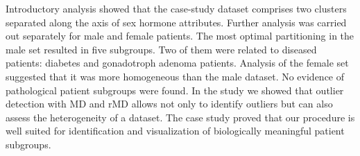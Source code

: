 \documentclass[\main/boa.tex]{subfiles}
\begin{document}
Introductory analysis showed that the case-study dataset comprises two
clusters separated along the axis of sex hormone attributes. Further
analysis was carried out separately for male and female patients. The
most optimal partitioning in the male set resulted in five subgroups.
Two of them were related to diseased patients: diabetes and gonadotroph
adenoma patients. Analysis of the female set suggested that it was more
homogeneous than the male dataset. No evidence of pathological patient
subgroups were found. In the study we showed that outlier detection with
MD and rMD allows not only to identify outliers but can also assess the
heterogeneity of a dataset. The case study proved that our procedure is
well suited for identification and visualization of biologically
meaningful patient subgroups.
\end{document}

